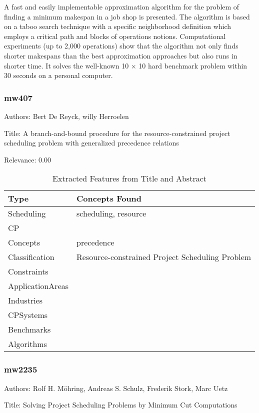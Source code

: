   A fast and easily implementable approximation algorithm for the problem of finding a minimum makespan in a job shop is presented. The algorithm is based on a taboo search technique with a specific neighborhood definition which employs a critical path and blocks of operations notions. Computational experiments (up to 2,000 operations) show that the algorithm not only finds shorter makespans than the best approximation approaches but also runs in shorter time. It solves the well-known 10 × 10 hard benchmark problem within 30 seconds on a personal computer.  

\subsubsection{mw407}
\label{mw:mw407}

Authors: Bert De Reyck, willy Herroelen

Title: A branch-and-bound procedure for the resource-constrained project scheduling problem with generalized precedence relations

Relevance:  0.00

{\scriptsize
\begin{longtable}{p{2cm}p{20cm}}
\caption{Extracted Features from Title and Abstract}\\ \toprule
Type & Concepts Found\\ \midrule
\endhead
\bottomrule
\endfoot
Scheduling & scheduling, resource\\ 
CP & \\ 
Concepts & precedence\\ 
Classification & Resource-constrained Project Scheduling Problem\\ 
Constraints & \\ 
ApplicationAreas & \\ 
Industries & \\ 
CPSystems & \\ 
Benchmarks & \\ 
Algorithms & \\ 
\end{longtable}
}



\subsubsection{mw2235}
\label{mw:mw2235}

Authors: Rolf H. Möhring, Andreas S. Schulz, Frederik Stork, Marc Uetz

Title: Solving Project Scheduling Problems by Minimum Cut Computations

